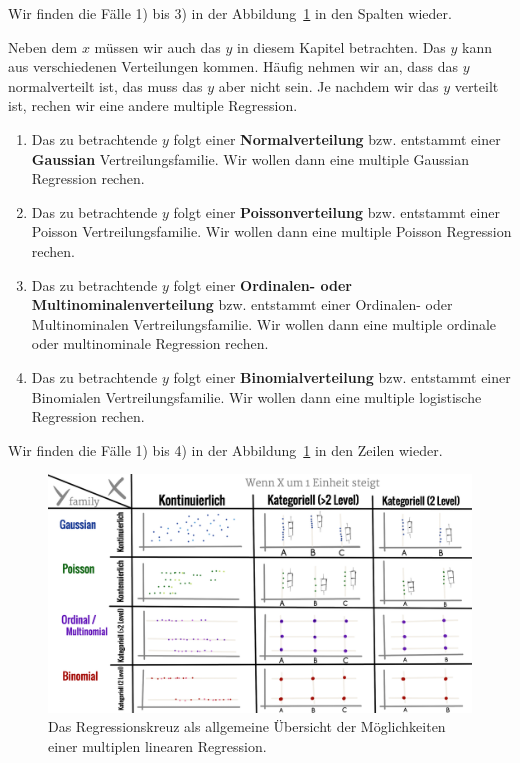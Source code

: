 \documentclass[
  letterpaper,
]{scrbook}
\providecommand{\tightlist}{%
  \setlength{\itemsep}{0pt}\setlength{\parskip}{0pt}}\usepackage{longtable,booktabs,array}
\begin{document}
Wir finden die Fälle 1) bis 3) in der Abbildung~\ref{fig-reg-cross} in
den Spalten wieder.

Neben dem \(x\) müssen wir auch das \(y\) in diesem Kapitel betrachten.
Das \(y\) kann aus verschiedenen Verteilungen kommen. Häufig nehmen wir
an, dass das \(y\) normalverteilt ist, das muss das \(y\) aber nicht
sein. Je nachdem wir das \(y\) verteilt ist, rechen wir eine andere
multiple Regression.

\begin{enumerate}
\def\labelenumi{\arabic{enumi})}
\tightlist
\item
  Das zu betrachtende \(y\) folgt einer \textbf{Normalverteilung} bzw.
  entstammt einer \textbf{Gaussian} Vertreilungsfamilie. Wir wollen dann
  eine multiple Gaussian Regression rechen.
\item
  Das zu betrachtende \(y\) folgt einer \textbf{Poissonverteilung} bzw.
  entstammt einer Poisson Vertreilungsfamilie. Wir wollen dann eine
  multiple Poisson Regression rechen.
\item
  Das zu betrachtende \(y\) folgt einer \textbf{Ordinalen- oder
  Multinominalenverteilung} bzw. entstammt einer Ordinalen- oder
  Multinominalen Vertreilungsfamilie. Wir wollen dann eine multiple
  ordinale oder multinominale Regression rechen.
\item
  Das zu betrachtende \(y\) folgt einer \textbf{Binomialverteilung} bzw.
  entstammt einer Binomialen Vertreilungsfamilie. Wir wollen dann eine
  multiple logistische Regression rechen.
\end{enumerate}

Wir finden die Fälle 1) bis 4) in der Abbildung~\ref{fig-reg-cross} in
den Zeilen wieder.

\begin{figure}

{\centering \includegraphics[width=1\textwidth,height=\textheight]{./images/Regressionskreut_advanced.png}

}

\caption{\label{fig-reg-cross}Das Regressionskreuz als allgemeine
Übersicht der Möglichkeiten einer multiplen linearen Regression.}

\end{figure}
\end{document}
